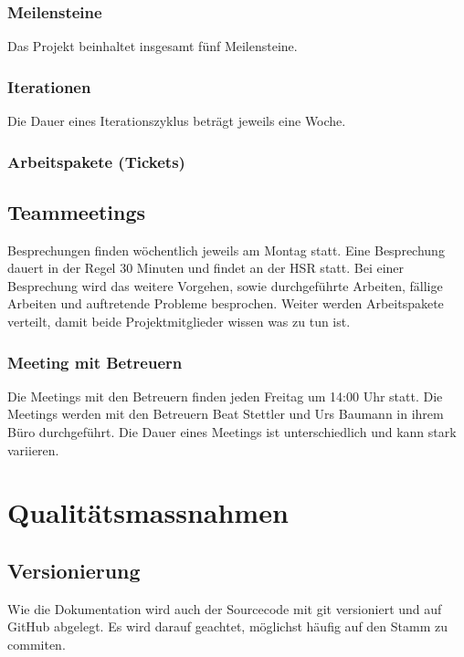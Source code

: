 \subsubsection{Meilensteine}
Das Projekt beinhaltet insgesamt fünf Meilensteine. \\


\subsubsection{Iterationen}
Die Dauer eines Iterationszyklus beträgt jeweils eine Woche. 

\begin{landscape}
\subsubsection{Arbeitspakete (Tickets)}
\end{landscape}


\subsection{Teammeetings}
Besprechungen finden wöchentlich jeweils am Montag statt. 
Eine Besprechung dauert in der Regel 30 Minuten und findet an der HSR statt. Bei einer Besprechung wird das weitere Vorgehen, sowie durchgeführte Arbeiten, fällige Arbeiten und auftretende Probleme besprochen. Weiter werden Arbeitspakete verteilt, damit beide Projektmitglieder wissen was zu tun ist. 

\subsubsection{Meeting mit Betreuern}
Die Meetings mit den Betreuern finden jeden Freitag um 14:00 Uhr statt. 
Die Meetings werden mit den Betreuern Beat Stettler und Urs Baumann in ihrem Büro durchgeführt. Die Dauer eines Meetings ist unterschiedlich und kann stark variieren. 

\section{Qualitätsmassnahmen}
\subsection{Versionierung}
Wie die Dokumentation wird auch der Sourcecode mit git versioniert und auf GitHub abgelegt. Es wird darauf geachtet, möglichst häufig auf den Stamm zu commiten.
